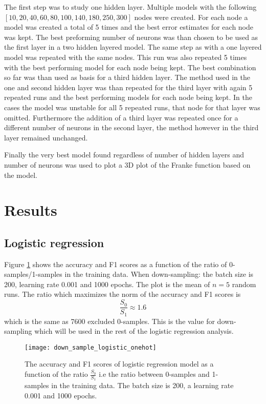 \documentclass[uio,jmp,amsmath,amssymb,reprint,nofootinbib]{revtex4-1}
\numberwithin{equation}{section}
\begin{document}
The first step was to study one hidden layer. Multiple models with the following \([10, 20, 40, 60, 80, 100, 140, 180, 250, 300]\) nodes were created. For each node a model was created a total of 5 times and the best error estimates for each node was kept. The best preforming number of neurons was than chosen to be used as the first layer in a two hidden layered model. The same step as with a one layered model was repeated with the same nodes. This run was also repeated 5 times with the best performing model for each node being kept. The best combination so far was than used as basis for a third hidden layer. The method used in the one and second hidden layer was than repeated for the third layer with again 5 repeated runs and the best performing models for each node being kept. In the cases the model was unstable for all 5 repeated runs, that node for that layer was omitted. Furthermore the addition of a third layer was repeated once for a different number of neurons in the second layer, the method however in the third layer remained unchanged.

Finally the very best model found regardless of number of hidden layers and number of neurons was used to plot a 3D plot of the Franke function based on the model.


\section{Results}\label{sec:Results}

\subsection{Logistic regression}

Figure \ref{fig:02} shows the accuracy and F1 scores as a function of the ratio of 0-samples/1-samples in the training data. When down-sampling: the batch size is 200, learning rate 0.001 and 1000 epochs. The plot is the mean of \(n=5\) random runs. The ratio which maximizes the norm of the accuracy and F1 scores is
\begin{equation}\label{eq:16}
\frac{S_0}{S_1} \approx 1.6
\end{equation}
which is the same as 7600 excluded 0-samples. This is the value for down-sampling which will be used in the rest of the logistic regression analysis.

\begin{figure}[H]
    \centering
    \texttt{[image: down\_sample\_logistic\_onehot]}
    \caption{The accuracy and F1 scores of logistic regression model as a function of the ratio \(\frac{S_0}{S_1}\) i.e the ratio between 0-samples and 1-samples in the training data. The batch size is 200, a learning rate 0.001 and 1000 epochs.}
    \label{fig:02}
\end{figure}
\end{document}
